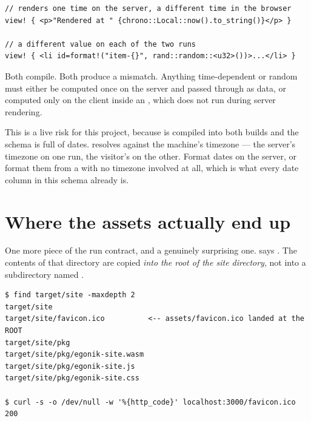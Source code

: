 \begin{antipattern}
\begin{lstlisting}[style=rs]
// renders one time on the server, a different time in the browser
view! { <p>"Rendered at " {chrono::Local::now().to_string()}</p> }

// a different value on each of the two runs
view! { <li id=format!("item-{}", rand::random::<u32>())>...</li> }
\end{lstlisting}
Both compile. Both produce a mismatch. Anything time-dependent or random must either be computed
once on the server and passed through as data, or computed only on the client inside an
, which does not run during server rendering.
\end{antipattern}

\begin{pitfall}
This is a live risk for this project, because  is compiled into both builds and the
schema is full of dates.  resolves against the machine's timezone --- the
server's timezone on one run, the visitor's on the other. Format dates on the server, or format
them from a  with no timezone involved at all, which is what every date column in
this schema already is.
\end{pitfall}

\section{Where the assets actually end up}

One more piece of the run contract, and a genuinely surprising one.  says
. The contents of that directory are copied \emph{into the root of the
site directory}, not into a subdirectory named .

\begin{verified}
\begin{lstlisting}[style=out]
$ find target/site -maxdepth 2
target/site
target/site/favicon.ico          <-- assets/favicon.ico landed at the ROOT
target/site/pkg
target/site/pkg/egonik-site.wasm
target/site/pkg/egonik-site.js
target/site/pkg/egonik-site.css

$ curl -s -o /dev/null -w '%{http_code}' localhost:3000/favicon.ico
200
\end{lstlisting}
\end{verified}

